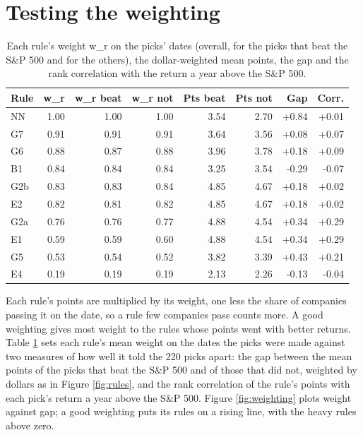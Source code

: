 \documentclass[11pt,a4paper]{article}
\begin{document}
\section{Testing the weighting}
\label{app:weighting}
\begin{table}[H]
\centering
\small
\caption{Each rule's weight w\_r on the picks' dates (overall, for the picks that beat the S\&P 500 and for the others), the dollar-weighted mean points, the gap and the rank correlation with the return a year above the S\&P 500.}\label{tab:weighting}
\begin{tabular}{l r r r r r r r}
\hline
Rule & w\_r & w\_r beat & w\_r not & Pts beat & Pts not & Gap & Corr. \\
\hline
NN & 1.00 & 1.00 & 1.00 & 3.54 & 2.70 & +0.84 & +0.01 \\
G7 & 0.91 & 0.91 & 0.91 & 3.64 & 3.56 & +0.08 & +0.07 \\
G6 & 0.88 & 0.87 & 0.88 & 3.96 & 3.78 & +0.18 & +0.09 \\
B1 & 0.84 & 0.84 & 0.84 & 3.25 & 3.54 & -0.29 & -0.07 \\
G2b & 0.83 & 0.83 & 0.84 & 4.85 & 4.67 & +0.18 & +0.02 \\
E2 & 0.82 & 0.81 & 0.82 & 4.85 & 4.67 & +0.18 & +0.02 \\
G2a & 0.76 & 0.76 & 0.77 & 4.88 & 4.54 & +0.34 & +0.29 \\
E1 & 0.59 & 0.59 & 0.60 & 4.88 & 4.54 & +0.34 & +0.29 \\
G5 & 0.53 & 0.54 & 0.52 & 3.82 & 3.39 & +0.43 & +0.21 \\
E4 & 0.19 & 0.19 & 0.19 & 2.13 & 2.26 & -0.13 & -0.04 \\
\hline
\end{tabular}
\end{table}
Each rule's points are multiplied by its weight, one less the share of companies passing it on the date, so a rule few companies pass counts more. A good weighting gives most weight to the rules whose points went with better returns. Table \ref{tab:weighting} sets each rule's mean weight on the dates the picks were made against two measures of how well it told the 220 picks apart: the gap between the mean points of the picks that beat the S\&P 500 and of those that did not, weighted by dollars as in Figure \ref{fig:rules}, and the rank correlation of the rule's points with each pick's return a year above the S\&P 500. Figure \ref{fig:weighting} plots weight against gap; a good weighting puts its rules on a rising line, with the heavy rules above zero.
\end{document}
